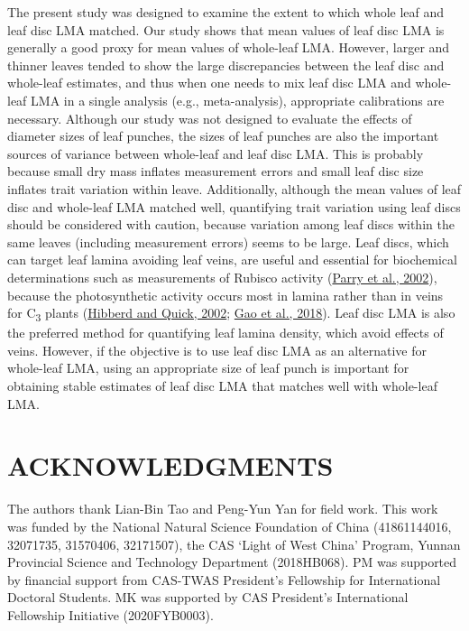 \documentclass[
  12pt,
  a4paper,
,tablecaptionabove
]{scrartcl}
\begin{document}
The present study was designed to examine the extent to which whole leaf and leaf disc LMA matched.
Our study shows that mean values of leaf disc LMA is generally a good proxy for mean values of whole-leaf LMA.
However, larger and thinner leaves tended to show the large discrepancies between the leaf disc and whole-leaf estimates, and thus when one needs to mix leaf disc LMA and whole-leaf LMA in a single analysis (e.g., meta-analysis), appropriate calibrations are necessary.
Although our study was not designed to evaluate the effects of diameter sizes of leaf punches, the sizes of leaf punches are also the important sources of variance between whole-leaf and leaf disc LMA.
This is probably because small dry mass inflates measurement errors and small leaf disc size inflates trait variation within leave.
Additionally, although the mean values of leaf disc and whole-leaf LMA matched well, quantifying trait variation using leaf discs should be considered with caution, because variation among leaf discs within the same leaves (including measurement errors) seems to be large.
Leaf discs, which can target leaf lamina avoiding leaf veins, are useful and essential for biochemical determinations such as measurements of Rubisco activity (\protect\hyperlink{ref-Parry2002}{Parry et al., 2002}), because the photosynthetic activity occurs most in lamina rather than in veins for C\textsubscript{3} plants (\protect\hyperlink{ref-Hibberd2002}{Hibberd and Quick, 2002}; \protect\hyperlink{ref-Gao2018}{Gao et al., 2018}).
Leaf disc LMA is also the preferred method for quantifying leaf lamina density, which avoid effects of veins.
However, if the objective is to use leaf disc LMA as an alternative for whole-leaf LMA, using an appropriate size of leaf punch is important for obtaining stable estimates of leaf disc LMA that matches well with whole-leaf LMA.

\hypertarget{acknowledgments}{%
\section{ACKNOWLEDGMENTS}\label{acknowledgments}}

The authors thank Lian-Bin Tao and Peng-Yun Yan for field work.
This work was funded by the National Natural Science Foundation of China (41861144016, 32071735, 31570406, 32171507), the CAS `Light of West China' Program, Yunnan Provincial Science and Technology Department (2018HB068).
PM was supported by financial support from CAS-TWAS President's Fellowship for International Doctoral Students.
MK was supported by CAS President's International Fellowship Initiative (2020FYB0003).
\end{document}
